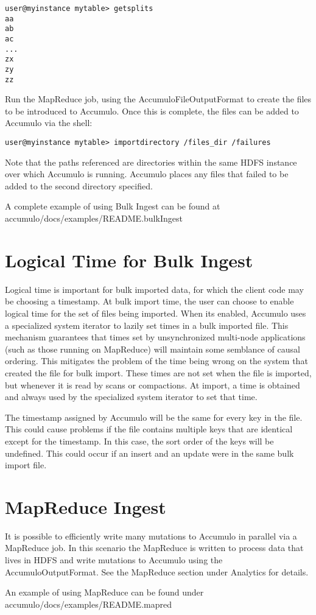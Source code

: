 \begingroup\fontsize{8pt}{8pt}\selectfont\begin{verbatim}
user@myinstance mytable> getsplits
aa
ab
ac
...
zx
zy
zz
\end{verbatim}\endgroup

Run the MapReduce job, using the AccumuloFileOutputFormat to create the files to
be introduced to Accumulo. Once this is complete, the files can be added to
Accumulo via the shell:

\begingroup\fontsize{8pt}{8pt}\selectfont\begin{verbatim}
user@myinstance mytable> importdirectory /files_dir /failures
\end{verbatim}\endgroup

Note that the paths referenced are directories within the same HDFS instance over
which Accumulo is running. Accumulo places any files that failed to be added to the
second directory specified.

A complete example of using Bulk Ingest can be found at\\
accumulo/docs/examples/README.bulkIngest

\section{Logical Time for Bulk Ingest}

Logical time is important for bulk imported data, for which the client code may
be choosing a timestamp. At bulk import time, the user can choose to enable
logical time for the set of files being imported. When its enabled, Accumulo
uses a specialized system iterator to lazily set times in a bulk imported file.
This mechanism guarantees that times set by unsynchronized multi-node
applications (such as those running on MapReduce) will maintain some semblance
of causal ordering. This mitigates the problem of the time being wrong on the
system that created the file for bulk import. These times are not set when the
file is imported, but whenever it is read by scans or compactions. At import, a
time is obtained and always used by the specialized system iterator to set that
time.

The timestamp assigned by Accumulo will be the same for every key in the file.
This could cause problems if the file contains multiple keys that are identical
except for the timestamp. In this case, the sort order of the keys will be
undefined. This could occur if an insert and an update were in the same bulk
import file.

\section{MapReduce Ingest}
It is possible to efficiently write many mutations to Accumulo in parallel via a
MapReduce job. In this scenario the MapReduce is written to process data that lives
in HDFS and write mutations to Accumulo using the AccumuloOutputFormat. See
the MapReduce section under Analytics for details.

An example of using MapReduce can be found under\\
accumulo/docs/examples/README.mapred

